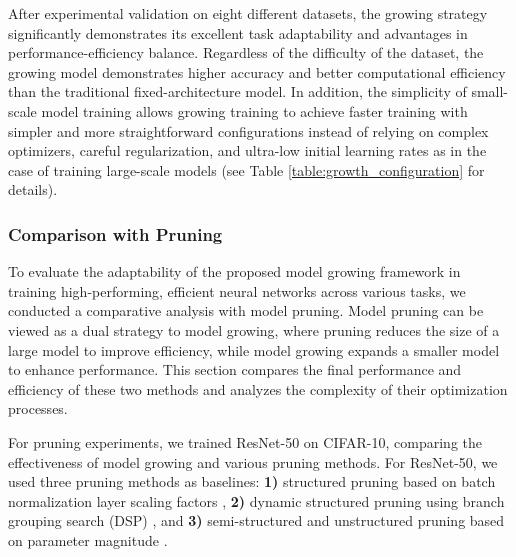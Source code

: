 \documentclass[preprint,12pt]{elsarticle}
\begin{document}
After experimental validation on eight different datasets, the growing strategy significantly demonstrates its excellent task adaptability and advantages in performance-efficiency balance. Regardless of the difficulty of the dataset, the growing model demonstrates higher accuracy and better computational efficiency than the traditional fixed-architecture model. In addition, the simplicity of small-scale model training allows growing training to achieve faster training with simpler and more straightforward configurations instead of relying on complex optimizers, careful regularization, and ultra-low initial learning rates as in the case of training large-scale models (see Table \ref{table:growth_configuration} for details).

\subsubsection{Comparison with Pruning}

To evaluate the adaptability of the proposed model growing framework in training high-performing, efficient neural networks across various tasks, we conducted a comparative analysis with model pruning. Model pruning can be viewed as a dual strategy to model growing, where pruning reduces the size of a large model to improve efficiency, while model growing expands a smaller model to enhance performance. This section compares the final performance and efficiency of these two methods and analyzes the complexity of their optimization processes.

For pruning experiments, we trained ResNet-50 on CIFAR-10, comparing the effectiveness of model growing and various pruning methods. For ResNet-50, we used three pruning methods as baselines: \textbf{1)} structured pruning based on batch normalization layer scaling factors \cite{bnpruning}, \textbf{2)} dynamic structured pruning using branch grouping search (DSP) \cite{dsp}, and \textbf{3)} semi-structured and unstructured pruning based on parameter magnitude \cite{sparsegpt}.
\end{document}
